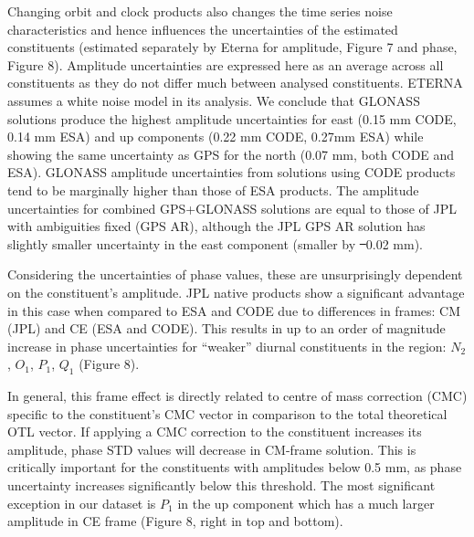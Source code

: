 \documentclass[se, manuscript]{copernicus}
\providecommand{\DIFadd}[1]{{\protect\color{blue}\uwave{#1}}} %
\providecommand{\DIFdel}[1]{{\protect\color{red}\sout{#1}}}                      %
\providecommand{\DIFaddbegin}{} %
\providecommand{\DIFaddend}{} %
\providecommand{\DIFdelbegin}{} %
\providecommand{\DIFdelend}{} %
\begin{document}
Changing orbit and clock products also changes the time series noise characteristics and hence influences the uncertainties of the estimated constituents (estimated separately by Eterna for amplitude, Figure 7 and phase, Figure 8). Amplitude uncertainties are expressed here as an average across all constituents as they do not differ much between analysed constituents. ETERNA assumes a white noise model in its analysis. We conclude that GLONASS solutions produce the highest amplitude uncertainties for east (0.15 mm CODE, 0.14 mm ESA) and up components (0.22 mm CODE, 0.27mm ESA) while showing the same uncertainty as GPS for the north (0.07 mm, both CODE and ESA). GLONASS amplitude uncertainties from solutions using CODE products tend to be marginally higher than those of ESA products. The amplitude uncertainties for combined GPS+GLONASS solutions are equal to those of JPL with ambiguities fixed (GPS AR), although the JPL GPS AR solution has slightly smaller uncertainty in the east component (smaller by \DIFdelbegin \DIFdel{~}\DIFdelend \DIFaddbegin \DIFadd{$\sim$}\DIFaddend 0.02 mm).


Considering the uncertainties of phase values, these are unsurprisingly dependent on the constituent’s amplitude. JPL native products show a significant advantage in this case when compared to ESA and CODE due to differences in frames: CM (JPL) and CE (ESA and CODE). This results in up to an order of magnitude increase in phase uncertainties for “weaker” diurnal constituents in the region: $N_2$, $O_1$, $P_1$, $Q_1$ (Figure 8).

In general, this frame effect is directly related to centre of mass correction (CMC) specific to the constituent's CMC vector in comparison to the total theoretical OTL vector. If applying a CMC correction to the constituent increases its amplitude, phase STD values will decrease in CM-frame solution. This is critically important for the constituents with amplitudes below 0.5 mm, as phase uncertainty increases significantly below this threshold. The most significant exception in our dataset is $P_1$ in the up component which has a much larger amplitude in CE frame (Figure 8, right in top and bottom). 
\end{document}
